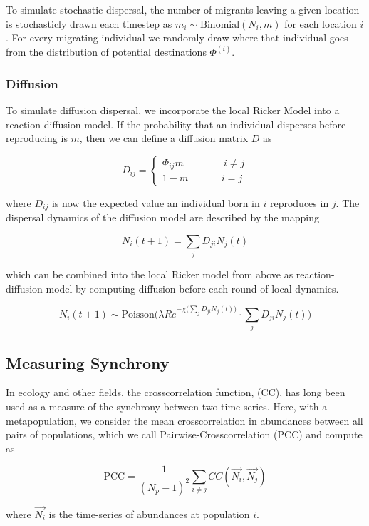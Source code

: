 \documentclass[11pt]{article}
\begin{document}
To simulate stochastic dispersal, the number of migrants leaving a given
location is stochasticly drawn each timestep as
\(m_{i} \sim \text{Binomial}(N_i, m)\) for each location \(i\). For
every migrating individual we randomly draw where that individual goes
from the distribution of potential destinations \(\Phi^{(i)}\).

\hypertarget{diffusion}{%
\subsubsection{Diffusion}\label{diffusion}}

To simulate diffusion dispersal, we incorporate the local Ricker Model
into a reaction-diffusion model. If the probability that an individual
disperses before reproducing is \(m\), then we can define a diffusion
matrix \(D\) as

\[D_{ij} = \begin{cases} \Phi_{ij}m \quad\quad\quad &\ i \neq j \\ 1-m  & i=j \end{cases}\]

where \(D_{ij}\) is now the expected value an individual born in \(i\)
reproduces in \(j\). The dispersal dynamics of the diffusion model are
described by the mapping

\[N_i(t+1) = \sum_j D_{ji} N_j(t)\]

which can be combined into the local Ricker model from above as
reaction-diffusion model by computing diffusion before each round of
local dynamics.

\[N_i(t+1) \sim \text{Poisson}\bigg( \lambda R e^{-\chi \big(\sum_j D_{ji}
N_j(t)\big)} \cdot \sum_j D_{ji} N_j(t) \bigg)\]

\hypertarget{measuring-synchrony}{%
\subsection{Measuring Synchrony}\label{measuring-synchrony}}

In ecology and other fields, the crosscorrelation function, (CC), has
long been used as a measure of the synchrony between two time-series.
Here, with a metapopulation, we consider the mean crosscorrelation in
abundances between all pairs of populations, which we call
Pairwise-Crosscorrelation (\(\text{PCC}\)) and compute as

\[\text{PCC}=\frac{1}{(N_p-1)^2}\sum_{i \neq j} CC(\vec{N_i},\vec{N_j})\]

where \(\vec{N_i}\) is the time-series of abundances at population
\(i\).
\end{document}
